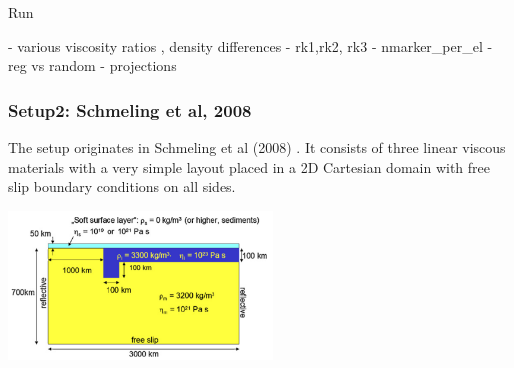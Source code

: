 Run 

- various viscosity ratios , density differences
- rk1,rk2, rk3
- nmarker\_per\_el
- reg vs random
- projections




\subsubsection*{Setup2: Schmeling et al, 2008}

The setup originates in Schmeling et al (2008) \cite{scbe08}. It consists of three linear viscous
materials with a very simple layout placed in a 2D Cartesian domain with free slip boundary conditions 
on all sides. 

\begin{center}
\includegraphics[width=7cm]{python_codes/fieldstone_67/images/scbe08}
\end{center}


